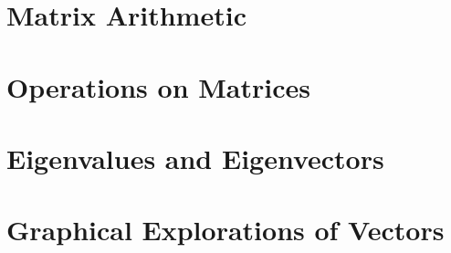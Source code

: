 \documentclass[10pt]{book}
\begin{document}




\clearpage{\pagestyle{empty}\cleardoublepage}

\chapter{Matrix Arithmetic}\label{chapter:arithmetic}
\thispagestyle{empty}















\clearpage{\pagestyle{empty}\cleardoublepage}

\chapter{Operations on Matrices}\label{chapter:ops}
\thispagestyle{empty}











\clearpage{\pagestyle{empty}\cleardoublepage}

\chapter{Eigenvalues and Eigenvectors}\label{chapter:eigen}
\thispagestyle{empty}




%
\clearpage{\pagestyle{empty}\cleardoublepage}

\chapter{Graphical Explorations of Vectors}\label{chapter:graph}
\thispagestyle{empty}







\appendix
%

\clearpage{\pagestyle{empty}\cleardoublepage}
{}
\printindex
%
\end{document}
